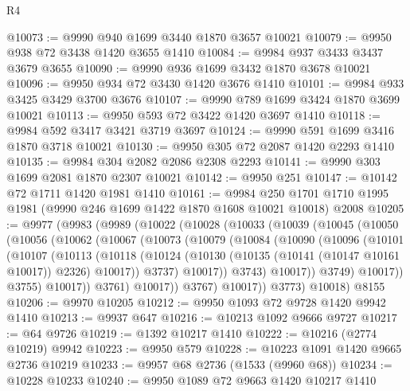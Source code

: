 \begin{lexlean}{R4}
\begin{coremodule}
@10073 := @9990 @940 @1699 @3440 @1870 @3657 @10021
@10079 := @9950 @938 @72 @3438 @1420 @3655 @1410
@10084 := @9984 @937 @3433 @3437 @3679 @3655
@10090 := @9990 @936 @1699 @3432 @1870 @3678 @10021
@10096 := @9950 @934 @72 @3430 @1420 @3676 @1410
@10101 := @9984 @933 @3425 @3429 @3700 @3676
@10107 := @9990 @789 @1699 @3424 @1870 @3699 @10021
@10113 := @9950 @593 @72 @3422 @1420 @3697 @1410
@10118 := @9984 @592 @3417 @3421 @3719 @3697
@10124 := @9990 @591 @1699 @3416 @1870 @3718 @10021
@10130 := @9950 @305 @72 @2087 @1420 @2293 @1410
@10135 := @9984 @304 @2082 @2086 @2308 @2293
@10141 := @9990 @303 @1699 @2081 @1870 @2307 @10021
@10142 := @9950 @251
@10147 := @10142 @72 @1711 @1420 @1981 @1410
@10161 := @9984
    @250
    @1701
    @1710
    @1995
    @1981
    (@9990 @246 @1699 @1422 @1870 @1608 @10021 @10018)
    @2008
@10205 := @9977
    (@9983
      (@9989
        (@10022
          (@10028
            (@10033
              (@10039
                (@10045
                  (@10050
                    (@10056
                      (@10062
                        (@10067
                          (@10073
                            (@10079
                              (@10084
                                (@10090
                                  (@10096
                                    (@10101
                                      (@10107
                                        (@10113
                                          (@10118
                                            (@10124
                                              (@10130
                                                (@10135 (@10141 (@10147 @10161 @10017)) @2326)
                                                @10017))
                                            @3737)
                                          @10017))
                                      @3743)
                                    @10017))
                                @3749)
                              @10017))
                          @3755)
                        @10017))
                    @3761)
                  @10017))
              @3767)
            @10017))
        @3773)
      @10018)
    @8155
@10206 := @9970 @10205
@10212 := @9950 @1093 @72 @9728 @1420 @9942 @1410
@10213 := @9937 @647
@10216 := @10213 @1092 @9666 @9727
@10217 := @64 @9726
@10219 := @1392 @10217 @1410
@10222 := @10216 (@2774 @10219) @9942
@10223 := @9950 @579
@10228 := @10223 @1091 @1420 @9665 @2736 @10219
@10233 := @9957 @68 @2736 (@1533 (@9960 @68))
@10234 := @10228 @10233
@10240 := @9950 @1089 @72 @9663 @1420 @10217 @1410

\end{coremodule}
\end{lexlean}
